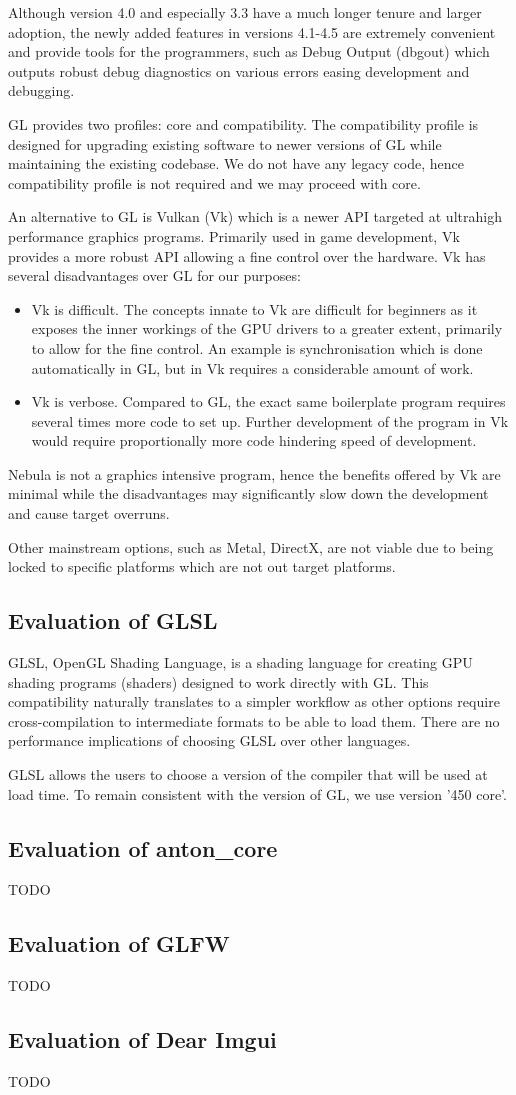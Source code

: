 \documentclass[12pt, a4paper]{article}
\newenvironment{itemlist}
{
  \vspace{-0.5\topsep}
  \begin{itemize}
    \setlength{\itemsep}{4pt}
    \setlength{\parskip}{0pt}
} {
  \end{itemize}
  \vspace{-0.5\topsep}
}
\begin{document}
Although version 4.0 and especially 3.3 have a much longer tenure and larger
adoption, the newly added features in versions 4.1-4.5 are extremely convenient
and provide tools for the programmers, such as Debug Output (dbgout) which
outputs robust debug diagnostics on various errors easing development and
debugging.

GL provides two profiles: core and compatibility. The compatibility profile is
designed for upgrading existing software to newer versions of GL while
maintaining the existing codebase. We do not have any legacy code, hence
compatibility profile is not required and we may proceed with core.

An alternative to GL is Vulkan (Vk) which is a newer API targeted at ultrahigh
performance graphics programs. Primarily used in game development, Vk provides a
more robust API allowing a fine control over the hardware. Vk has several
disadvantages over GL for our purposes:
\begin{itemlist}
\item Vk is difficult. The concepts innate to Vk are difficult for beginners as
  it exposes the inner workings of the GPU drivers to a greater extent,
  primarily to allow for the fine control. An example is synchronisation which
  is done automatically in GL, but in Vk requires a considerable amount of work.
\item Vk is verbose. Compared to GL, the exact same boilerplate program requires
  several times more code to set up. Further development of the program in Vk
  would require proportionally more code hindering speed of development.
\end{itemlist}

Nebula is not a graphics intensive program, hence the benefits offered by Vk
are minimal while the disadvantages may significantly slow down the development
and cause target overruns.

Other mainstream options, such as Metal, DirectX, are not viable due to being
locked to specific platforms which are not out target platforms.

\subsection{Evaluation of GLSL}
GLSL, OpenGL Shading Language, is a shading language for creating GPU shading
programs (shaders) designed to work directly with GL. This compatibility
naturally translates to a simpler workflow as other options require
cross-compilation to intermediate formats to be able to load them. There are no
performance implications of choosing GLSL over other languages.

GLSL allows the users to choose a version of the compiler that will be used at
load time. To remain consistent with the version of GL, we use version '450
core'.

\subsection{Evaluation of anton{\_}core} TODO

\subsection{Evaluation of GLFW}
TODO

\subsection{Evaluation of Dear Imgui}
TODO
\end{document}

